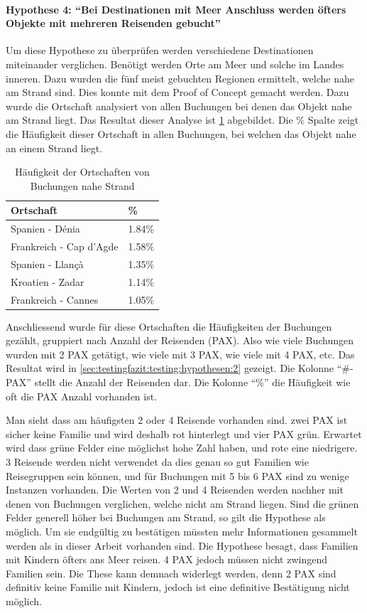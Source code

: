 \paragraph{Hypothese 4: "`Bei Destinationen mit Meer Anschluss werden öfters Objekte mit mehreren Reisenden gebucht"'} Um diese Hypothese zu überprüfen werden verschiedene Destinationen miteinander verglichen. Benötigt werden Orte am Meer und solche im Landes inneren. Dazu wurden die fünf meist gebuchten Regionen ermittelt, welche nahe am Strand sind. Dies konnte mit dem Proof of Concept gemacht werden. Dazu wurde die Ortschaft analysiert von allen Buchungen bei denen das Objekt nahe am Strand liegt. Das Resultat dieser Analyse ist \cref{sec:testingfazit:testing:hypothesen:1} abgebildet. Die \% Spalte zeigt die Häufigkeit dieser Ortschaft in allen Buchungen, bei welchen das Objekt nahe an einem Strand liegt.

\begin{table}[H] 
	\caption{Häufigkeit der Ortschaften von Buchungen nahe Strand}
	\centering
	\label{sec:testingfazit:testing:hypothesen:1}
	\begin{tabular}{ | l | l | } 
		\hline 
		\rowcolor{tableheadcolor}
		\bfseries Ortschaft & \bfseries \% \\ \hline 
		Spanien - Dénia & 1.84\% \\ \hline 
		Frankreich - Cap d'Agde & 1.58\% \\ \hline 
		Spanien - Llançà & 1.35\% \\ \hline 
		Kroatien - Zadar & 1.14\% \\ \hline 
		Frankreich - Cannes & 1.05\% \\ \hline 
	\end{tabular}
\end{table}

Anschliessend wurde für diese Ortschaften die Häufigkeiten der Buchungen gezählt, gruppiert nach Anzahl der Reisenden (PAX). Also wie viele Buchungen wurden mit 2 PAX getätigt, wie viele mit 3 PAX, wie viele mit 4 PAX, etc. Das Resultat wird in \cref{sec:testingfazit:testing:hypothesen:2} gezeigt. Die Kolonne "`\#-PAX"' stellt die Anzahl der Reisenden dar. Die Kolonne "`\%"' die Häufigkeit wie oft die PAX Anzahl vorhanden ist.

Man sieht dass am häufigsten 2 oder 4 Reisende vorhanden sind. zwei PAX ist sicher keine Familie und wird deshalb \colorbox{red!25}{rot} hinterlegt und vier PAX \colorbox{green!25}{grün}. Erwartet wird dass grüne Felder eine möglichst hohe Zahl haben, und rote eine niedrigere. 3 Reisende werden nicht verwendet da dies genau so gut Familien wie Reisegruppen sein können, und für Buchungen mit 5 bis 6 PAX sind zu wenige Instanzen vorhanden. Die Werten von 2 und 4 Reisenden werden nachher mit denen von Buchungen verglichen, welche nicht am Strand liegen. Sind die grünen Felder generell höher bei Buchungen am Strand, so gilt die Hypothese als möglich. Um sie endgültig zu bestätigen müssten mehr Informationen gesammelt werden als in dieser Arbeit vorhanden sind. Die Hypothese besagt, dass Familien mit Kindern öfters ans Meer reisen. 4 PAX jedoch müssen nicht zwingend Familien sein. Die These kann demnach widerlegt werden, denn 2 PAX sind definitiv keine Familie mit Kindern, jedoch ist eine definitive Bestätigung nicht möglich. 

